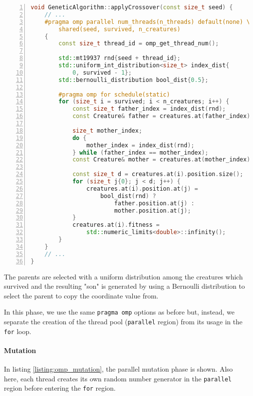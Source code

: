 \documentclass[12pt,a4paper,oneside]{article}
\begin{document}
	\begin{lstlisting}[language=C++,
		directivestyle={\color{black}},
		backgroundcolor=\color{lgrey},
    	basicstyle=\footnotesize \ttfamily \color{black} \bfseries,
		numbers=left,
		numbersep=5pt,
    	numberstyle=\tiny\color{black},
		commentstyle=\color{dkgreen},
    	rulecolor=\color{black},
    	keywordstyle=\color{purple},
    	morekeywords={size_t,std},
		tabsize=2,
    	captionpos=b,
    	caption={Parallel crossover phase in OpenMP.},
    	label={listing:omp_crossover}
	   ]
void GeneticAlgorithm::applyCrossover(const size_t seed) {
	// ...
	#pragma omp parallel num_threads(n_threads) default(none) \
		shared(seed, survived, n_creatures)
	{
		const size_t thread_id = omp_get_thread_num();

		std::mt19937 rnd{seed + thread_id};
		std::uniform_int_distribution<size_t> index_dist{
			0, survived - 1};
		std::bernoulli_distribution bool_dist{0.5};

		#pragma omp for schedule(static)
		for (size_t i = survived; i < n_creatures; i++) {
			const size_t father_index = index_dist(rnd);
			const Creature& father = creatures.at(father_index);

			size_t mother_index;
			do {
				mother_index = index_dist(rnd);
			} while (father_index == mother_index);
			const Creature& mother = creatures.at(mother_index);

			const size_t d = creatures.at(i).position.size();
			for (size_t j{0}; j < d; j++) {
				creatures.at(i).position.at(j) =
					bool_dist(rnd) ?
						father.position.at(j) :
						mother.position.at(j);
			}
			creatures.at(i).fitness =
				std::numeric_limits<double>::infinity();
		}
	}
	// ...
}
	\end{lstlisting}

	The parents are selected with a uniform distribution among the creatures which survived and the resulting "son" is generated by using a Bernoulli distribution to select the parent to copy the coordinate value from.

	In this phase, we use the same \texttt{pragma omp} options as before but, instead, we separate the creation of the thread pool (\texttt{parallel} region) from its usage in the \texttt{for} loop.

	\paragraph{Mutation}
	In listing \ref{listing:omp_mutation}, the parallel mutation phase is shown.
	Also here, each thread creates its own random number generator in the \texttt{parallel} region before entering the \texttt{for} region.
\end{document}
